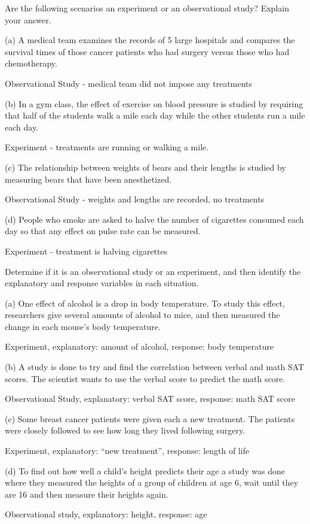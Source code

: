 \documentclass[../stats.tex]{subfiles}
\begin{document}
\pagebreak
\begin{example}
    Are the following scenarios an experiment or an observational study? Explain your answer.

    (a) A medical team examines the records of 5 large hospitals and compares the survival times of those cancer patients who had surgery versus those who had chemotherapy.

    Observational Study - medical team did not impose any treatments 

    (b) In a gym class, the effect of exercise on blood pressure is studied by requiring that half of the students walk a mile each day while the other students run a mile each day.

    Experiment - treatments are running or walking a mile.

    (c) The relationship between weights of bears and their lengths is studied by measuring bears that have been anesthetized.

    Observational Study - weights and lengths are recorded, no treatments 

    (d) People who smoke are asked to halve the number of cigarettes consumed each day so that any effect on pulse rate can be measured.

    Experiment - treatment is halving cigarettes
\end{example}

\begin{example}
    Determine if it is an observational study or an experiment, and then identify the explanatory and response variables in each situation.

    (a) One effect of alcohol is a drop in body temperature. To study this effect, researchers give several amounts of alcohol to mice, and then measured the change in each mouse's body temperature.

    Experiment, explanatory: amount of alcohol, response: body temperature 

    (b) A study is done to try and find the correlation between verbal and math SAT scores. The scientist wants to use the verbal score to predict the math score.

    Observational Study, explanatory: verbal SAT score, response: math SAT score 

    (c) Some breast cancer patients were given each a new treatment. The patients were closely followed to see how long they lived following surgery.

    Experiment, explanatory: ``new treatment'', response: length of life 

    (d) To find out how well a child's height predicts their age a study was done where they measured the heights of a group of children at age 6, wait until they are 16 and then measure their heights again.

    Observational study, explanatory: height, response: age
\end{example}
\end{document}

